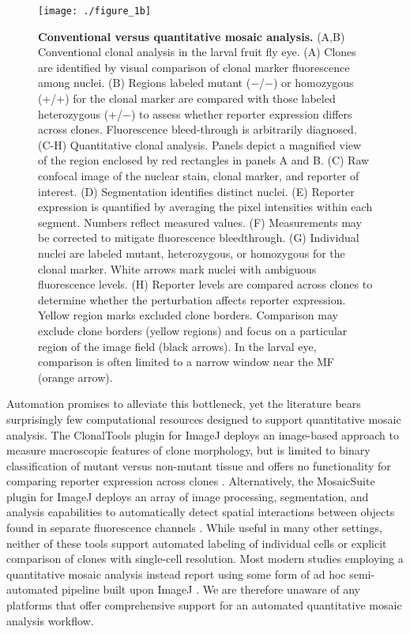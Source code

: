 \begin{figure}[!h]
\centering
\texttt{[image: ./figure\_1b]}
\caption[Conventional versus quantitative mosaic analysis.]{\textbf{Conventional versus quantitative mosaic analysis.} (A,B) Conventional clonal analysis in the larval fruit fly eye. (A) Clones are identified by visual comparison of clonal marker fluorescence among nuclei. (B) Regions labeled mutant ($-$/$-$) or homozygous (+/+) for the clonal marker are compared with those labeled heterozygous (+/$-$) to assess whether reporter expression differs across clones. Fluorescence bleed-through is arbitrarily diagnosed. (C-H) Quantitative clonal analysis. Panels depict a magnified view of the region enclosed by red rectangles in panels A and B. (C) Raw confocal image of the nuclear stain, clonal marker, and reporter of interest. (D) Segmentation identifies distinct nuclei. (E) Reporter expression is quantified by averaging the pixel intensities within each segment. Numbers reflect measured values. (F) Measurements may be corrected to mitigate fluorescence bleedthrough. (G) Individual nuclei are labeled mutant, heterozygous, or homozygous for the clonal marker. White arrows mark nuclei with ambiguous fluorescence levels. (H) Reporter levels are compared across clones to determine whether the perturbation affects reporter expression. Yellow region marks excluded clone borders. Comparison may exclude clone borders (yellow regions) and focus on a particular region of the image field (black arrows). In the larval eye, comparison is often limited to a narrow window near the MF (orange arrow).}
\label{fig:clones:fig1b}
\end{figure}

Automation promises to alleviate this bottleneck, yet the literature bears surprisingly few computational resources designed to support quantitative mosaic analysis. The ClonalTools plugin for ImageJ deploys an image-based approach to measure macroscopic features of clone morphology, but is limited to binary classification of mutant versus non-mutant tissue and offers no functionality for comparing reporter expression across clones \cite{Mort2009}. Alternatively, the MosaicSuite plugin for ImageJ deploys an array of image processing, segmentation, and analysis capabilities to automatically detect spatial interactions between objects found in separate fluorescence channels \cite{Helmuth2010,Shivanandan2013}. While useful in many other settings, neither of these tools support automated labeling of individual cells or explicit comparison of clones with single-cell resolution. Most modern studies employing a quantitative mosaic analysis instead report using some form of ad hoc semi-automated pipeline built upon ImageJ \cite{Dai2017,Ghiglione2018,Li2018}. We are therefore unaware of any platforms that offer comprehensive support for an automated quantitative mosaic analysis workflow.

